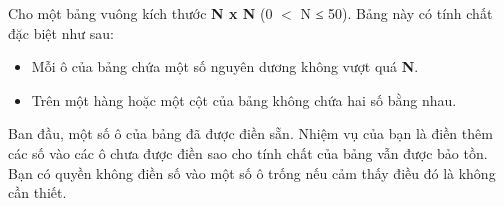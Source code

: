 Cho một bảng vuông kích thước \textbf{N x N }(0 $<$ N ≤ 50). Bảng này có tính chất đặc biệt như sau:
\begin{itemize}
	\item Mỗi ô của bảng chứa một số nguyên dương không vượt quá \textbf{N}.
	\item Trên một hàng hoặc một cột của bảng không chứa hai số bằng nhau. 
\end{itemize}

Ban đầu, một số ô của bảng đã được điền sẵn. Nhiệm vụ của bạn là điền thêm các số vào các ô chưa được điền sao cho tính chất của bảng vẫn được bảo tồn. Bạn có quyền không điền số vào một số ô trống nếu cảm thấy điều đó là không cần thiết.